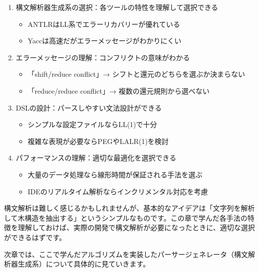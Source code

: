 \begin{enumerate}
\item
  構文解析器生成系の選択：各ツールの特性を理解して選択できる

\begin{itemize}
\item
  ANTLRはLL系でエラーリカバリーが優れている
\item
  Yaccは高速だがエラーメッセージがわかりにくい
\end{itemize}

\item
  エラーメッセージの理解：コンフリクトの意味がわかる

\begin{itemize}
\item
  「shift/reduce conflict」→ シフトと還元のどちらを選ぶか決まらない
\item
  「reduce/reduce conflict」→ 複数の還元規則から選べない
\end{itemize}

\item
  DSLの設計：パースしやすい文法設計ができる

\begin{itemize}
\item
  シンプルな設定ファイルならLL(1)で十分
\item
  複雑な表現が必要ならPEGやLALR(1)を検討
\end{itemize}

\item
  パフォーマンスの理解：適切な最適化を選択できる

\begin{itemize}
\item
  大量のデータ処理なら線形時間が保証される手法を選ぶ
\item
  IDEのリアルタイム解析ならインクリメンタル対応を考慮
\end{itemize}
\end{enumerate}

構文解析は難しく感じるかもしれませんが、基本的なアイデアは「文字列を解析して木構造を抽出する」というシンプルなものです。この章で学んだ各手法の特徴を理解しておけば、実際の開発で構文解析が必要になったときに、適切な選択ができるはずです。

次章では、ここで学んだアルゴリズムを実装したパーサージェネレータ（構文解析器生成系）について具体的に見ていきます。
